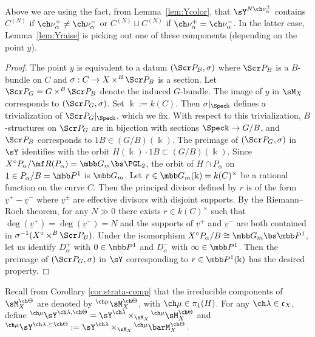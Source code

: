 \documentclass[final]{amsart}
\theoremstyle{remark}
\theoremstyle{definition}
\DeclareMathOperator*{\xt}{\times}
\numberwithin{equation}{section}
\begin{document}
Above we are using the fact, from Lemma~\ref{lem:Ycolor}, that 
$\sY^{N\ch\nu_\alpha^\pm}$ contains $C^{(N)}$ if $\ch\nu_\alpha^+ \ne \ch\nu_\alpha^-$ 
or $C^{(N)}\sqcup C^{(N)}$ if $\ch\nu_\alpha^+ = \ch\nu_\alpha^-$. 
In the latter case, Lemma~\ref{lem:Yraise} is picking out one of these components
(depending on the point $y$). 

\begin{proof}
The point $y$ is equivalent to a datum $(\Scr P_B, \sigma)$
where $\Scr P_B$ is a $B$-bundle on $C$ and $\sigma : C \to X \xt^B \Scr P_B$ is a section. 
Let $\Scr P_G = G \xt^B \Scr P_B$ denote the induced $G$-bundle.
The image of $y$ in $\sM_X$ corresponds to $(\Scr P_G, \sigma)$.
Set $\Bbbk := k(C)$. Then $\sigma|_{\Spec \Bbbk}$ defines a trivialization 
of $\Scr P_G|_{\Spec \Bbbk}$, which we fix. 
With respect to this trivialization, $B$-structures on $\Scr P_G$
are in bijection with sections $\Spec \Bbbk \to G/B$,
and $\Scr P_B$ corresponds to $1B \in (G/B)(\Bbbk)$. 
The preimage of $(\Scr P_G,\sigma)$ in $\sY$ identifies with the
orbit 
$H(\Bbbk)\cdot 1B \subset (G/B)(\Bbbk)$. 
Since $X^\circ P_\alpha/\mf R(P_\alpha)=\mbb G_m\bs \PGL_2$, the orbit of 
$H\cap P_\alpha$ on $1\in P_\alpha/B = \mbb P^1$ is 
$\mbb G_m$. Let $r \in \mbb G_m(\Bbbk) = k(C)^\times$ 
be a rational function on the curve $C$. 
Then the principal divisor defined by $r$ is of the form 
$\underline v^+ - \underline v^-$ where $\underline v^\pm$ 
are effective divisors with disjoint supports.
By the Riemann--Roch theorem, for any $N \gg 0$  
there exists $r \in k(C)^\times$ such that $\deg(\underline v^+)=\deg(\underline v^-)=N$ and the supports of $\underline v^+$ and $\underline v^-$
are both contained in $\sigma^{-1}(X^\circ \xt^B \Scr P_B)$.
Under the isomorphism $X^\circ P_\alpha/B \cong \mbb G_m \bs \mbb P^1$,
let us identify $D_\alpha^+$ with $0\in \mbb P^1$ and
$D_\alpha^-$ with $\infty \in \mbb P^1$. 
Then the preimage of $(\Scr P_G,\sigma)$ in $\sY$ corresponding to 
$r\in \mbb P^1(\Bbbk)$ has the desired property.
\end{proof}


Recall from Corollary \ref{cor:strata-comp} that the irreducible components of $\sM_X^{\ch\Theta}$ are denoted by ${^{\ch\mu}\sM_X^{\ch\Theta}}$, with $\ch\mu\in \pi_1(H)$. 
For any $\ch\lambda\in \mathfrak c_X$, define 
$^{\ch\mu}\sY^{\ch\lambda,\ch\Theta} = \sY^{\ch\lambda} \xt_{\sM_X} {^{\ch\mu}\sM_X^{\ch\Theta}}$
and 
$^{\ch\mu}\sY^{\ch\lambda,\succeq \ch\Theta} := \sY^{\ch\lambda} \xt_{\sM_X} 
{^{\ch\mu}}\barM_X^{\ch\Theta}$.
\end{document}
